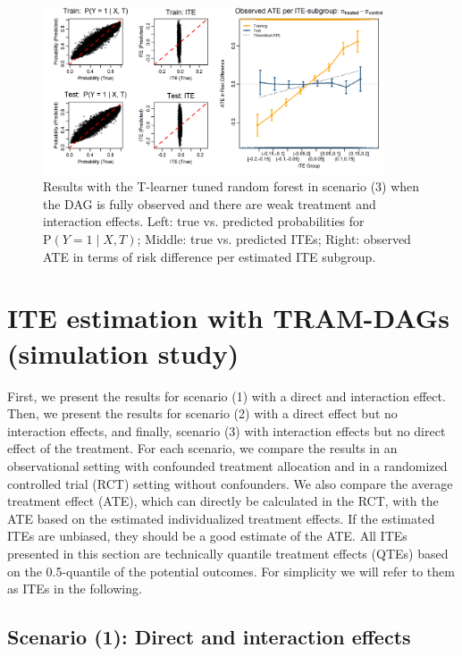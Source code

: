 \begin{figure}[htbp]
\centering
\includegraphics[width=0.9\textwidth]{img/results_ITE_simulation/small_interaction_tuned_rf_tlearner.png}
\caption{Results with the T-learner tuned random forest in scenario (3) when the DAG is fully observed and there are weak treatment and interaction effects. Left: true vs. predicted probabilities for $\text{P}(Y=1 \mid X, T)$; Middle: true vs. predicted ITEs; Right: observed ATE in terms of risk difference per estimated ITE subgroup.}
\label{fig:small_interaction_tuned_rf_tlearner}
\end{figure}


\clearpage


\section{ITE estimation with TRAM-DAGs (simulation study)}

First, we present the results for scenario (1) with a direct and interaction effect. Then, we present the results for scenario (2) with a direct effect but no interaction effects, and finally, scenario (3) with interaction effects but no direct effect of the treatment. For each scenario, we compare the results in an observational setting with confounded treatment allocation and in a randomized controlled trial (RCT) setting without confounders. We also compare the average treatment effect (ATE), which can directly be calculated in the RCT, with the ATE based on the estimated individualized treatment effects. If the estimated ITEs are unbiased, they should be a good estimate of the ATE. All ITEs presented in this section are technically quantile treatment effects (QTEs) based on the 0.5-quantile of the potential outcomes. For simplicity we will refer to them as ITEs in the following.


\subsection{Scenario (1): Direct and interaction effects} 

